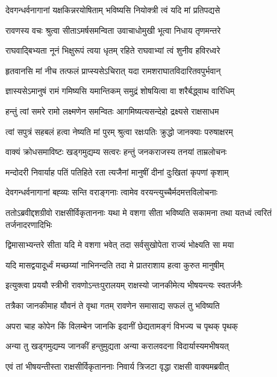 \twolineshloka
{देवगन्धर्वनागानां यक्षकिन्नरयोषिताम्}
{भविष्यसि नियोक्त्री त्वं यदि मां प्रतिपद्यसे} %

\twolineshloka
{रावणस्य वचः श्रुत्वा सीताऽमर्षसमन्विता}
{उवाचाधोमुखी भूत्वा निधाय तृणमन्तरे} %

\twolineshloka
{राघवाद्बिभ्यता नूनं भिक्षुरूपं त्वया धृतम्}
{रहिते राघवाभ्यां त्वं शुनीव हविरध्वरे} %

\twolineshloka
{हृतवानसि मां नीच तत्फलं प्राप्स्यसेऽचिरात्}
{यदा रामशराघातविदारितवपुर्भवान्} %

\twolineshloka
{ज्ञास्यसेऽमानुषं रामं गमिष्यसि यमान्तिकम्}
{समुद्रं शोषयित्वा वा शरैर्बद्ध्वाथ वारिधिम्} %

\twolineshloka
{हन्तुं त्वां समरे रामो लक्ष्मणेन समन्वितः}
{आगमिष्यत्यसन्देहो द्रक्ष्यसे राक्षसाधम} %

\twolineshloka
{त्वां सपुत्रं सहबलं हत्वा नेष्यति मां पुरम्}
{श्रुत्वा रक्षःपतिः क्रुद्धो जानक्याः परुषाक्षरम्} %

\twolineshloka
{वाक्यं क्रोधसमाविष्टः खड्गमुद्यम्य सत्वरः}
{हन्तुं जनकराजस्य तनयां ताम्रलोचनः} %

\twolineshloka
{मन्दोदरी निवार्याह पतिं पतिहिते रता}
{त्यजैनां मानुषीं दीनां दुःखितां कृपणां कृशाम्} %

\twolineshloka
{देवगन्धर्वनागानां बह्व्यः सन्ति वराङ्गनाः}
{त्वामेव वरयन्त्युच्चैर्मदमत्तविलोचनाः} %

\threelineshloka
{ततोऽब्रवीद्दशग्रीवो राक्षसीर्विकृताननाः}
{यथा मे वशगा सीता भविष्यति सकामना}
{तथा यतध्वं त्वरितं तर्जनादरणादिभिः} %

\twolineshloka
{द्विमासाभ्यन्तरे सीता यदि मे वशगा भवेत्}
{तदा सर्वसुखोपेता राज्यं भोक्ष्यति सा मया} %

\twolineshloka
{यदि मासद्वयादूर्ध्वं मच्छय्यां नाभिनन्दति}
{तदा मे प्रातराशाय हत्वा कुरुत मानुषीम्} %

\twolineshloka
{इत्युक्त्वा प्रययौ स्त्रीभी रावणोऽन्तःपुरालयम्}
{राक्षस्यो जानकीमेत्य भीषयन्त्यः स्वतर्जनैः} %

\twolineshloka
{तत्रैका जानकीमाह यौवनं ते वृथा गतम्}
{रावणेन समासाद्य सफलं तु भविष्यति} %

\twolineshloka
{अपरा चाह कोपेन किं विलम्बेन जानकि}
{इदानीं छेद्यतामङ्गं विभज्य च पृथक् पृथक्} %

\twolineshloka
{अन्या तु खड्गमुद्यम्य जानकीं हन्तुमुद्यता}
{अन्या करालवदना विदार्यास्यमभीषयत्} %

\twolineshloka
{एवं तां भीषयन्तीस्ता राक्षसीर्विकृताननाः}
{निवार्य त्रिजटा वृद्धा राक्षसी वाक्यमब्रवीत्} %

